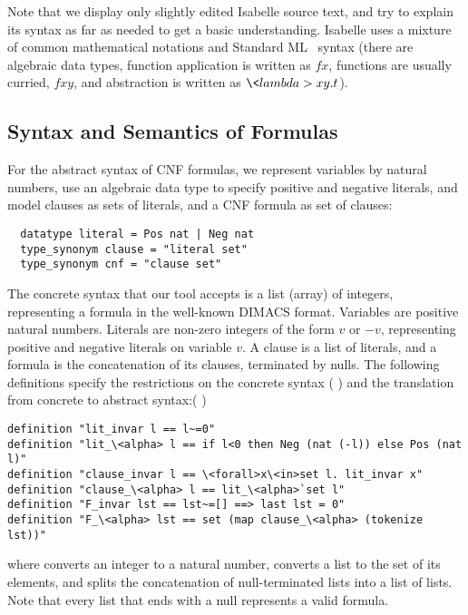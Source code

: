\documentclass[smallcondensed]{svjour3}     %
\makeatletter
\newcommand{\isai}{\lstinline[language=isabelle,basicstyle=\normalsize\ttfamily\slshape]}
\renewcommand\lstinline[1][]{%
  \leavevmode
  \ifmmode\expandafter\hbox\fi\bgroup
    \def\lst@boxpos{b}%
    \lsthk@PreSet\lstset{flexiblecolumns,#1}%
    \lsthk@TextStyle
    \@ifnextchar\bgroup{\afterassignment\lst@InlineG \let\@let@token}%
                       \lstinline@}
\makeatother
\begin{document}
Note that we display only slightly edited Isabelle source text, and try to explain its syntax as far as needed to get a basic understanding.
Isabelle uses a mixture of common mathematical notations and Standard ML~\cite{MHMT97} syntax (\eg there are algebraic data types, function application is written as 
\isai$f x$, functions are usually curried, \eg \isai$f x y$, and abstraction is written as \isai$\<lambda>x y. t$).


\subsection{Syntax and Semantics of Formulas}\label{sec:syn_sem_frml}
For the abstract syntax of CNF formulas, we represent variables by natural numbers, use an algebraic data type to specify positive and negative literals, and model clauses 
as sets of literals, and a CNF formula as set of clauses:
\begin{lstlisting}
  datatype literal = Pos nat | Neg nat
  type_synonym clause = "literal set"
  type_synonym cnf = "clause set"
\end{lstlisting}

The concrete syntax that our tool accepts is a list (array) of integers, representing a formula in the well-known DIMACS format.
Variables are positive natural numbers. Literals are non-zero integers of the form $v$ or $-v$, representing positive and negative literals on variable $v$.
A clause is a list of literals, and a formula is the concatenation of its clauses, terminated by nulls.
The following definitions specify the restrictions on the concrete syntax (\isai{xxx_invar}) and the translation from concrete to abstract syntax:(\isai{xxx_\<alpha>})
\begin{lstlisting}
definition "lit_invar l == l~=0"
definition "lit_\<alpha> l == if l<0 then Neg (nat (-l)) else Pos (nat l)"
definition "clause_invar l == \<forall>x\<in>set l. lit_invar x"
definition "clause_\<alpha> l == lit_\<alpha>`set l"
definition "F_invar lst == lst~=[] ==> last lst = 0"
definition "F_\<alpha> lst == set (map clause_\<alpha> (tokenize lst))"
\end{lstlisting}
where \isai{nat} converts an integer to a natural number, 
\isai{set} converts a list to the set of its elements, 
and \isai{tokenize l} splits the concatenation of null-terminated lists into a list of lists.
Note that every list that ends with a null represents a valid formula.
\end{document}

